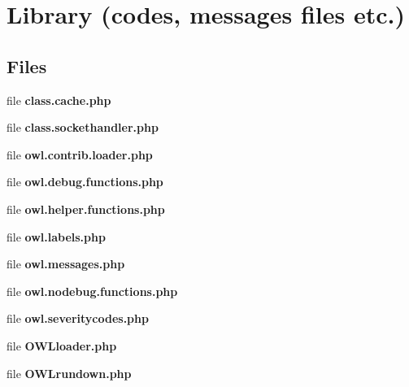 \section{Library (codes, messages files etc.)}
\label{group__OWL__LIBRARY}
\subsection*{Files}
\begin{DoxyCompactItemize}
\item 
file {\bf class.cache.php}
\item 
file {\bf class.sockethandler.php}
\item 
file {\bf owl.contrib.loader.php}
\item 
file {\bf owl.debug.functions.php}
\item 
file {\bf owl.helper.functions.php}
\item 
file {\bf owl.labels.php}
\item 
file {\bf owl.messages.php}
\item 
file {\bf owl.nodebug.functions.php}
\item 
file {\bf owl.severitycodes.php}
\item 
file {\bf OWLloader.php}
\item 
file {\bf OWLrundown.php}
\end{DoxyCompactItemize}
